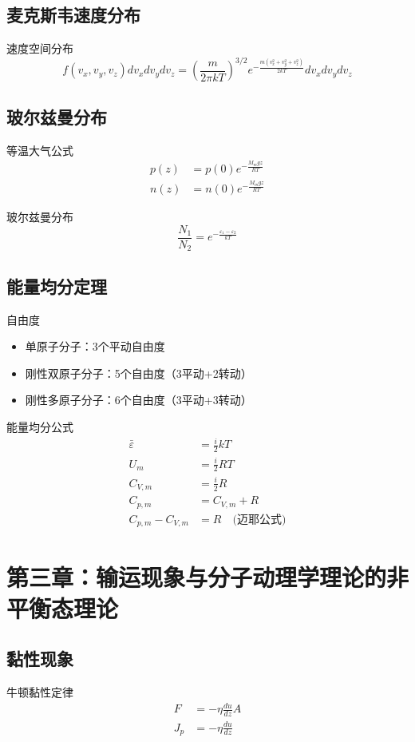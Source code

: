 \documentclass[12pt]{article}
\begin{document}
\subsection{麦克斯韦速度分布}
速度空间分布
\[
f(v_x, v_y, v_z)dv_x dv_y dv_z = \left(\frac{m}{2\pi kT}\right)^{3/2} e^{-\frac{m(v_x^2+v_y^2+v_z^2)}{2kT}} dv_x dv_y dv_z
\]

\subsection{玻尔兹曼分布}
等温大气公式
\begin{align*}
    p(z) &= p(0)e^{-\frac{M_m g z}{RT}} \\
    n(z) &= n(0)e^{-\frac{M_m g z}{RT}}
\end{align*}

玻尔兹曼分布
\[
\frac{N_1}{N_2} = e^{-\frac{\varepsilon_1 - \varepsilon_2}{kT}}
\]

\subsection{能量均分定理}
自由度
\begin{itemize}
    \item 单原子分子：3个平动自由度
    \item 刚性双原子分子：5个自由度（3平动+2转动）
    \item 刚性多原子分子：6个自由度（3平动+3转动）
\end{itemize}

能量均分公式
\begin{align*}
    \bar{\varepsilon} &= \frac{i}{2}kT \\
    U_m &= \frac{i}{2}RT \\
    C_{V,m} &= \frac{i}{2}R \\
    C_{p,m} &= C_{V,m} + R \\
    C_{p,m} - C_{V,m} &= R \quad \text{(迈耶公式)}
\end{align*}

\section{第三章：输运现象与分子动理学理论的非平衡态理论}
\subsection{黏性现象}
牛顿黏性定律
\begin{align*}
    F &= -\eta \frac{du}{dz} A \\
    J_p &= -\eta \frac{du}{dz}
\end{align*}
\end{document}
